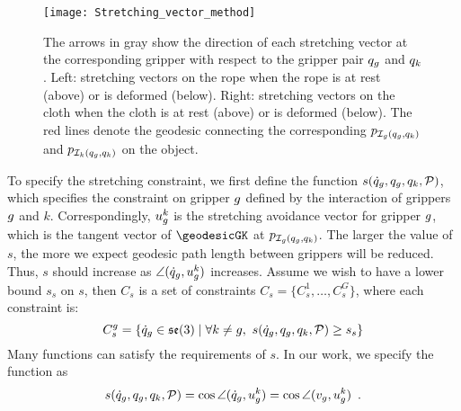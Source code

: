 \begin{figure}[h]
    \centering
    \texttt{[image: Stretching\_vector\_method]}
    \caption{The arrows in gray show the direction of each stretching vector at the corresponding gripper with respect to the gripper pair $q_g$ and $q_k$. Left: stretching vectors on the rope when the rope is at rest (above) or is deformed (below). Right: stretching vectors on the cloth when the cloth is at rest (above) or is deformed (below). The red lines denote the geodesic connecting the corresponding $p_{\mathcal{I}_g(q_g, q_k)}$ and $p_{\mathcal{I}_k(q_g, q_k)}$ on the object. }
    \label{Fig:stretching_avoidance_vector_method}
\end{figure}

To specify the stretching constraint, we first define the function $s(\dot{q}_g, q_g, q_k, \mathcal{P})$, which specifies the constraint on gripper $g$ defined by the interaction of grippers $g$ and $k$. Correspondingly, $u_g^k$ is the stretching avoidance vector for gripper $g$, which is the tangent vector of $\geodesicGK$ at $p_{\mathcal{I}_g(q_g, q_k)}$. The larger the value of $s$, the more we expect geodesic path length between grippers will be reduced. Thus, $s$ should increase as $\angle (\dot{q}_g, u_g^k)$ increases. Assume we wish to have a lower bound $s_s$ on $s$, then $C_s$ is a set of constraints $C_s = \{C_s^1, \dots, C_s^G\}$, where each constraint is:
\begin{equation}
    C_s^g =\{ \dot{q}_g\in \mathfrak{se}(3) \mid \forall k\neq g, \ s(\dot{q}_g, q_g, q_k, \mathcal{P}) \geq s_s  \}
    \label{Eq:Stretching_avoidance_Method}
\end{equation}
Many functions can satisfy the requirements of $s$. In our work, we specify the function as
\begin{equation}
    s(\dot{q}_g, q_g, q_k, \mathcal{P}) = \cos \angle (\dot{q}_g, u_g^k ) = \cos \angle (v_g, u_g^k ) \enspace .
    \label{Eq:Stretching_avoidance_Method_This_Paper}
\end{equation}

